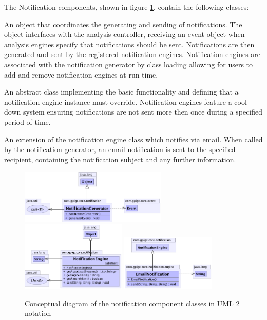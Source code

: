 \documentclass[10pt,a4paper]{article}
\begin{document}
The Notification components, shown in figure \ref{fig:notificationComponent}, 
contain the following classes:
\begin{description}[leftmargin=1cm,labelindent=1cm]
  \item [NotificationGenerator] An object that coordinates the generating and
    sending of notifications. The object interfaces with the analysis
    controller, receiving an event object when analysis engines specify that
    notifications should be sent. Notifications are then generated and sent by
    the registered notification engines. Notification engines are associated with
    the notification generator by class loading allowing for users to add and
    remove notification engines at run-time.
  \vspace{0.2cm}
  \item [NotificationEngine] An abstract class implementing the basic
    functionality and defining that a notification engine instance must
    override. Notification engines feature a cool down system ensuring 
    notifications are not sent more then once during a specified period of 
    time.\vspace{0.2cm} %
  \item [EmailNotification] An extension of the notification engine
    class which notifies via email. When called by the notification
    generator, an email notification is sent to the specified recipient, 
    containing the notification subject and any further information.
\end{description}
 
\begin{figure}[h!]
  \centering
  \includegraphics[width= 7cm]{images/Notification/NotificationGenerator.png}
  \includegraphics[width= 5cm]{images/Notification/NotificationEngine.png}
  \includegraphics[width= 4.5cm]{images/Notification/EmailNotification.png}
  \caption{Conceptual diagram of the notification component classes in
UML 2 notation}
  \label{fig:notificationComponent}
\end{figure}
\end{document}
